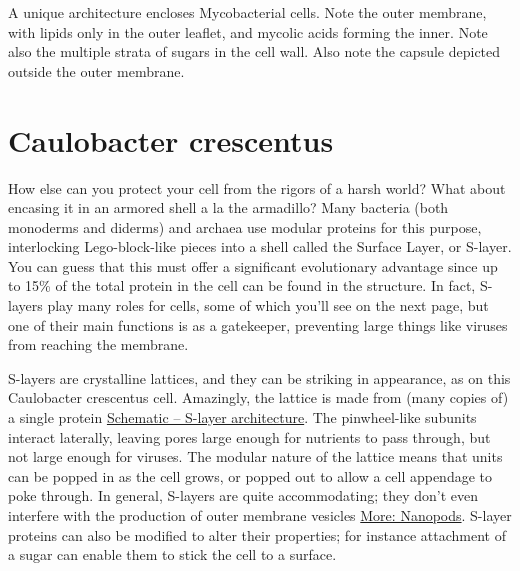 \documentclass[]{tufte-book}
\begin{document}
A unique architecture encloses Mycobacterial cells. Note the outer membrane, with lipids only in the outer leaflet, and mycolic acids forming the inner. Note also the multiple strata of sugars in the cell wall. Also note the capsule depicted outside the outer membrane.

\hypertarget{caulobacter-crescentus}{%
\section{Caulobacter crescentus}\label{caulobacter-crescentus}}

How else can you protect your cell from the rigors of a harsh world? What about encasing it in an armored shell a la the armadillo? Many bacteria (both monoderms and diderms) and archaea use modular proteins for this purpose, interlocking Lego-block-like pieces into a shell called the Surface Layer, or S-layer. You can guess that this must offer a significant evolutionary advantage since up to 15\% of the total protein in the cell can be found in the structure. In fact, S-layers play many roles for cells, some of which you'll see on the next page, but one of their main functions is as a gatekeeper, preventing large things like viruses from reaching the membrane.

S-layers are crystalline lattices, and they can be striking in appearance, as on this Caulobacter crescentus cell. Amazingly, the lattice is made from (many copies of) a single protein \protect\hyperlink{fig:2-6-1}{Schematic -- S-layer architecture}. The pinwheel-like subunits interact laterally, leaving pores large enough for nutrients to pass through, but not large enough for viruses. The modular nature of the lattice means that units can be popped in as the cell grows, or popped out to allow a cell appendage to poke through. In general, S-layers are quite accommodating; they don't even interfere with the production of outer membrane vesicles \protect\hyperlink{Nanopods}{More: Nanopods}. S-layer proteins can also be modified to alter their properties; for instance attachment of a sugar can enable them to stick the cell to a surface.

\hypertarget{htmlwidget-6132ec1a5fe4a51c3e3e}{}
\end{document}
